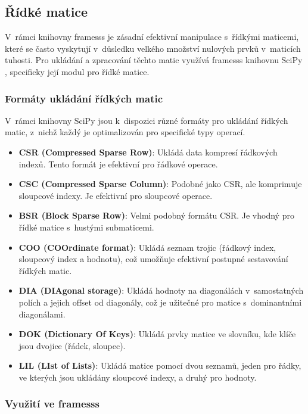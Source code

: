 \subsection{Řídké matice}

V~rámci knihovny framesss je zásadní efektivní manipulace s~řídkými maticemi, které se často vyskytují v~důsledku velkého množství nulových prvků v~maticích tuhosti. Pro ukládání a zpracování těchto matic využívá framesss knihovnu SciPy \cite{scipy}, specificky její modul pro řídké matice.

\subsubsection{Formáty ukládání řídkých matic}

V~rámci knihovny SciPy jsou k~dispozici různé formáty pro ukládání řídkých matic, z~nichž každý je optimalizován pro specifické typy operací.

\begin{itemize}
    \item \textbf{CSR (Compressed Sparse Row)}: Ukládá data kompresí řádkových indexů. Tento formát je efektivní pro řádkové operace.
    \item \textbf{CSC (Compressed Sparse Column)}: Podobné jako CSR, ale komprimuje sloupcové indexy. Je efektivní pro sloupcové operace.
    \item \textbf{BSR (Block Sparse Row)}: Velmi podobný formátu CSR. Je vhodný pro řídké matice s~hustými submaticemi.
    \item \textbf{COO (COOrdinate format)}: Ukládá seznam trojic (řádkový index, sloupcový index a hodnotu), což umožňuje efektivní postupné sestavování řídkých matic.
    \item \textbf{DIA (DIAgonal storage)}: Ukládá hodnoty na diagonálách v~samostatných polích a jejich offset od diagonály, což je užitečné pro matice s~dominantními diagonálami.
    \item \textbf{DOK (Dictionary Of Keys)}: Ukládá prvky matice ve slovníku, kde klíče jsou dvojice (řádek, sloupec).
    \item \textbf{LIL (LIst of Lists)}: Ukládá matice pomocí dvou seznamů, jeden pro řádky, ve kterých jsou ukládány sloupcové indexy, a druhý pro hodnoty.
\end{itemize}


\subsubsection{Využití ve framesss}

